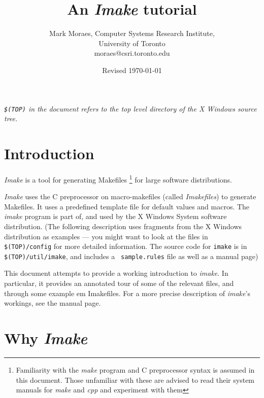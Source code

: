 %
%
%

\title{An {\em Imake} tutorial}

\author{Mark Moraes, Computer Systems Research Institute,\\
University of Toronto\\
moraes@csri.toronto.edu}
\date {Revised \today}


\maketitle

{\em {\tt \$(TOP)} in the document refers to the top level directory
of the X Windows source tree.}

\section{Introduction} {\em Imake} is a tool for generating Makefiles
\footnote{Familiarity with the {\em make} program and C preprocessor
syntax is assumed in this document. Those unfamiliar with these are
advised to read their system manuals for {\em make} and {\em cpp} and
experiment with them} for large software distributions.

{\em Imake} uses the C preprocessor on macro-makefiles (called {\em
Imakefiles}) to generate Makefiles. It uses a predefined template file
for default values and macros. The {\em imake} program is part of, and
used by the X Windows System software distribution. (The following
description uses fragments from the X Windows distribution as examples
--- you might want to look at the files in {\tt
\$(TOP)/config} for more detailed information. The source
code for {\tt imake} is in {\tt \$(TOP)/util/imake}, and includes a {\tt
sample.rules} file as well as a manual page)

This document attempts to provide a working introduction to {\em
imake}.  In particular, it provides an annotated tour of some of the
relevant files, and through some example {em Imakefiles}.  For a more
precise description of {\em imake}'s workings, see the manual page.

\section{Why {\em Imake}}

